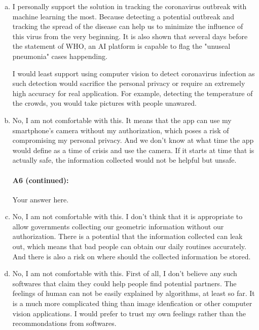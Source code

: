 \begin{enumerate}[(a)]

    \item I personally support the solution in tracking the coronavirus outbreak with machine learning the most. Because detecting a potential outbreak and tracking the spread of the disease can help us to minimize the influence of this virus from the very beginning. It is also shown that several days before the statement of WHO, an AI platform is capable to flag the "unuseal pneumonia" cases happending.

          I would least support using computer vision to detect coronavirus infection as such detection would sacrifice the personal privacy or require an extremely high accuracy for real application. For example, detecting the temperature of the crowds, you would take pictures with people unawared.

    \item No, I am not comfortable with this. It means that the app can use my smartphone's camera without my authorization, which poses a risk of compromising my personal privacy. And we don't know at what time the app would define as a time of crisis and use the camera. If it starts at time that is actually safe, the information collected would not be helpful but unsafe.

          \pagebreak
          \paragraph{A6 (continued):} Your answer here.

    \item No, I am not comfortable with this. I don't think that it is appropriate to allow governments collecting our geometric information without our authorization. There is a potential that the information collected can leak out, which means that bad people can obtain our daily routines accurately. And there is also a risk on where should the collected information be stored.

    \item No, I am not comfortable with this. First of all, I don't believe any such softwares that claim they could help people find potential partners. The feelings of human can not be easily explained by algorithms, at least so far. It is a much more complicated thing than image idenfication or other computer vision applications. I would prefer to trust my own feelings rather than the recommondations from softwares.

\end{enumerate}

